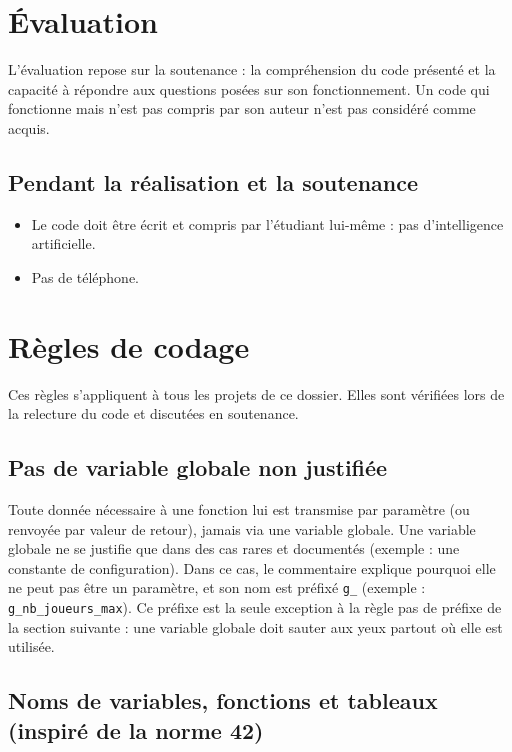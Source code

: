 \section{Évaluation}

L'évaluation repose sur la soutenance : la compréhension du code présenté
et la capacité à répondre aux questions posées sur son fonctionnement. Un
code qui fonctionne mais n'est pas compris par son auteur n'est pas
considéré comme acquis.

\subsection{Pendant la réalisation et la soutenance}
\begin{itemize}
  \item Le code doit être écrit et compris par l'étudiant lui-même : pas d'intelligence artificielle.
  \item Pas de téléphone.
\end{itemize}

\section{Règles de codage}

Ces règles s'appliquent à tous les projets de ce dossier. Elles sont
vérifiées lors de la relecture du code et discutées en soutenance.

\subsection{Pas de variable globale non justifiée}

Toute donnée nécessaire à une fonction lui est transmise par paramètre
(ou renvoyée par valeur de retour), jamais via une variable globale. Une
variable globale ne se justifie que dans des cas rares et documentés
(exemple : une constante de configuration). Dans ce cas, le commentaire
explique pourquoi elle ne peut pas être un paramètre, et son nom est
préfixé \texttt{g\_} (exemple : \texttt{g\_nb\_joueurs\_max}). Ce préfixe
est la seule exception à la règle \og pas de préfixe \fg{} de la section
suivante : une variable globale doit sauter aux yeux partout où elle est
utilisée.

\subsection{Noms de variables, fonctions et tableaux (inspiré de la norme 42)}

